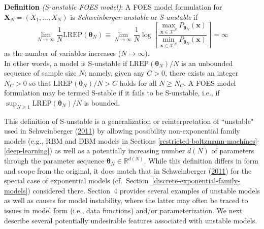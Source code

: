 \documentclass[12pt]{article}
\theoremstyle{definition}
\newcommand{\REP}{\mathrm{LREP}}
\begin{document}
  \vspace{.25cm}

\noindent \textbf{Definition} {\it(S-unstable FOES model)}:
A FOES model formulation for $\boldsymbol X_N=(X_1,\ldots,X_N)$ is \emph{Schweinberger-unstable} or \emph{S-unstable} if
\begin{equation}
\label{eqn:Sun}
\lim \limits_{N \rightarrow \infty} \frac{1}{N} \REP(\boldsymbol \theta_N) \equiv \lim \limits_{N \rightarrow \infty} \frac{1}{N}\log \left[\frac{\max\limits_{  \boldsymbol x\in \mathcal{X}^N}P_{\boldsymbol \theta_N}( \boldsymbol x)}{\min\limits_{ \boldsymbol x \in \mathcal{X}^N}P_{\boldsymbol \theta_N}( \boldsymbol x)}\right] = \infty
\end{equation}
 as the number of variables increases ($N \rightarrow \infty$).\\[.15cm]
In other words, a model is S-unstable if $\REP(\boldsymbol \theta_N)/N$ is an unbounded sequence of sample size  $N$; namely, given any $C > 0$, there exists an integer $N_C > 0$ so that $\REP(\boldsymbol \theta_N)/N > C$ holds for all $N \ge N_C$. A FOES model formulation may be termed S-stable if it fails to be S-unstable, i.e., if $\sup_{N \geq 1}\REP(\boldsymbol \theta_N)/N $ is bounded.

This definition of S-unstable is a generalization or reinterpretation of ``unstable" used in  Schweinberger
(\protect\hyperlink{ref-schweinberger2011instability}{2011}) by allowing possibility non-exponential family models (e.g., RBM and DBM models in Sections \ref{restricted-boltzmann-machines}-\ref{deep-learning}) as well as a potentially increasing number $d(N)$ of parameters through the parameter sequence $\boldsymbol \theta_N\in \mathbb{R}^{d(N)}$.  While this definition differs in form and scope from the original, it does match that in Schweinberger
(\protect\hyperlink{ref-schweinberger2011instability}{2011}) for the special case of exponential models (cf.~Section~\ref{discrete-exponential-family-models}) considered there.    Section~4 provides several examples  of unstable models as well as causes for model instability, where the latter may often be traced to issues in model form (i.e., data functions) and/or parameterization.  We next describe several potentially undesirable features associated with unstable models.\\
\end{document}
